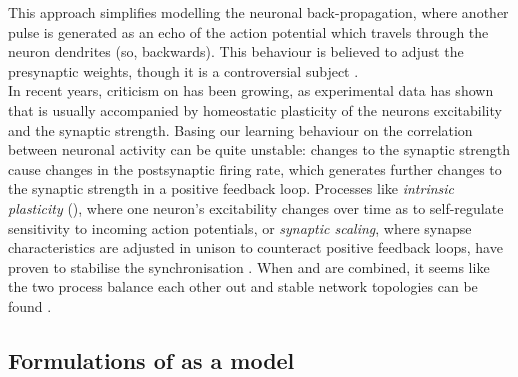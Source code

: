 
This approach simplifies modelling the neuronal back-propagation, where another pulse is generated as an echo of the action potential which travels through the neuron dendrites (so, backwards). This behaviour is believed to adjust the presynaptic weights, though it is a controversial subject \cite{Gerstner2002}. \\

In recent years, criticism on \STDP has been growing, as experimental data has shown that \STDP is usually accompanied by homeostatic plasticity of the neurons excitability and the synaptic strength. Basing our learning behaviour on the correlation between neuronal activity can be quite unstable: changes to the synaptic strength cause changes in the postsynaptic firing rate, which generates further changes to the synaptic strength in a positive feedback loop. Processes like \textsl{intrinsic plasticity} (\IP), where one neuron's excitability changes over time as to self-regulate sensitivity to incoming action potentials, or \textsl{synaptic scaling}, where synapse characteristics are adjusted in unison to counteract positive feedback loops, have proven to stabilise the synchronisation \cite{ChrolCannon2014, Kirkwood2019}. When \STDP and \IP are combined, it seems like the two process balance each other out and stable network topologies can be found \cite{Song2017}.


\subsection{Formulations of \STDP as a model}
